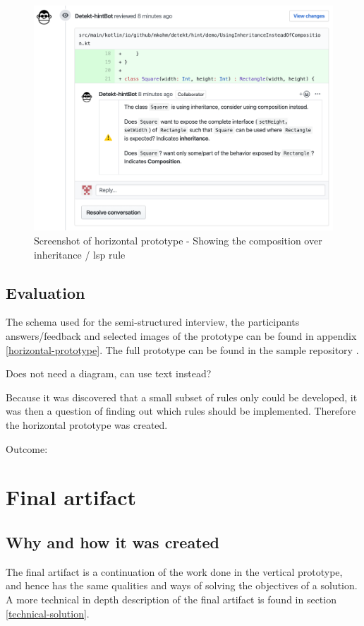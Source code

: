 \documentclass{report}
\begin{document}
\begin{figure}[h!]
    \centering
    \includegraphics[width=\textwidth]{../images/demo.png}
    \caption{Screenshot of horizontal prototype - Showing the composition over inheritance / \gls{lsp} rule}
    \label{fig:liskov}
\end{figure}



\subsection*{Evaluation}

The schema used for the semi-structured interview, the participants answers/feedback and selected images of the prototype can be found in appendix \ref{horizontal-prototype}. The full prototype can be found in the sample repository \cite{sample-repository}. 

Does not need a diagram, can use text instead?

Because it was discovered that a small subset of rules only could be developed, it was then a question of finding out which rules should be implemented. Therefore the horizontal prototype was created.


Outcome:


\section{Final artifact}
\subsection*{Why and how it was created}
The final artifact is a continuation of the work done in the vertical prototype, and hence has the same qualities and ways of solving the objectives of a solution. A more technical in depth description of the final artifact is found in section \ref{technical-solution}. 
\end{document}
